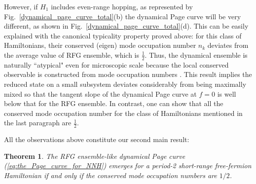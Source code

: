 \documentclass[twocolumn,english,prl,aps,superscriptaddress,amsmath,amssymb,floatfix]{revtex4-2}
\newtheorem{theorem}{Theorem}
\begin{document}
However, if $H_{1}$ includes even-range %
hopping, as represented by Fig.~\ref{dynamical_page_curve_total}(b) %
the dynamical Page curve will be very different, %
as shown in Fig.~\ref{dynamical_page_curve_total}(d).
This can be easily explained with the canonical typicality property
proved above: for this class of Hamiltonians, their conserved (eigen) mode
occupation number $n_{k}$ deviates from the average value of RFG ensemble,
which is %
$\frac{1}{2}$. %
Thus, %
the dynamical ensemble is naturally %
``atypical" even for microscopic scale because the local conserved observable is constructed from mode occupation numbers \citep{Ishii2019}. This result implies the reduced state on a small subsystem deviates considerably from being maximally mixed so that the tangent slope of the dynamical Page curve at $f=0$ is well below that for the RFG ensemble.
In contrast, one can show that all the conserved mode occupation number for the class of Hamiltonians mentioned in the last paragraph are $\frac{1}{2}$. 

All the observations above constitute our second main result: %
\begin{theorem}
The RFG ensemble-like dynamical Page curve (\ref{eq:the_Page_curve_for_NNH}) emerges for a period-2 short-range free-fermion Hamiltonian if and only if the conserved mode occupation numbers are $1/2$. %
\end{theorem}


\end{document}
